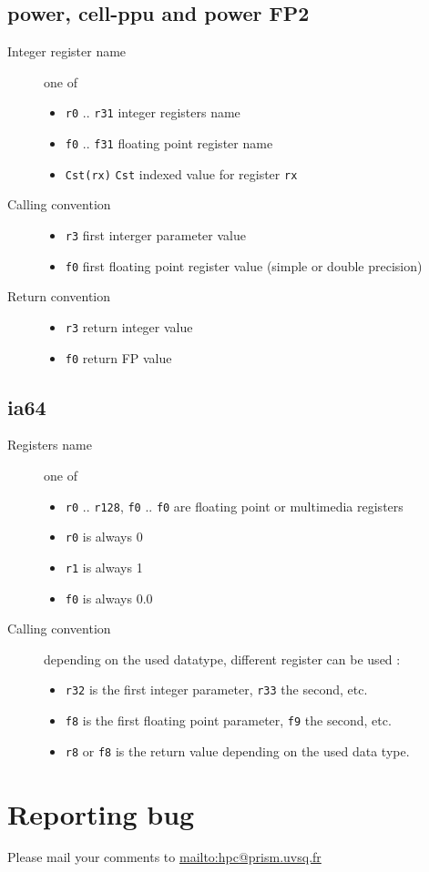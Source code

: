 \documentclass{article}
\begin{document}
\subsection{power, cell-ppu  and power FP2}

\begin{description}
\item[Integer register name]  one of
  \begin{itemize}
  \item \verb|r0| .. \verb|r31| integer registers name
  \item \verb|f0| .. \verb|f31| floating point register name
  \item \verb|Cst(rx)| \texttt{Cst} indexed value for register \texttt{rx}
  \end{itemize}
\item[Calling convention] 
  \begin{itemize}
  \item \verb|r3| first interger parameter value
  \item \verb|f0| first floating point register value (simple or double precision)
  \end{itemize}
\item[Return convention] 
  \begin{itemize}
  \item \verb|r3| return integer value
  \item \verb|f0| return FP value
  \end{itemize}

\end{description}

\subsection{ia64}

\begin{description}
\item[Registers name] one of
  \begin{itemize}
  \item \verb|r0| .. \verb|r128|, \verb|f0| .. \verb|f0| are floating
    point or multimedia registers
  \item \verb|r0| is always 0
  \item \verb|r1| is always 1
  \item \verb|f0| is always 0.0
  \end{itemize}
\item[Calling convention] depending on the used datatype, different
  register can be used :
  \begin{itemize}
  \item \verb|r32| is the first integer parameter, \verb|r33| the
    second, etc.
  \item \verb|f8| is the first floating point parameter, \verb|f9| the
    second, etc.
  \item \verb|r8| or \verb|f8| is the return value depending on the
    used data type.
  \end{itemize}
\end{description}

\section{Reporting bug}

Please mail your comments to \url{mailto:hpc@prism.uvsq.fr}



\end{document}
